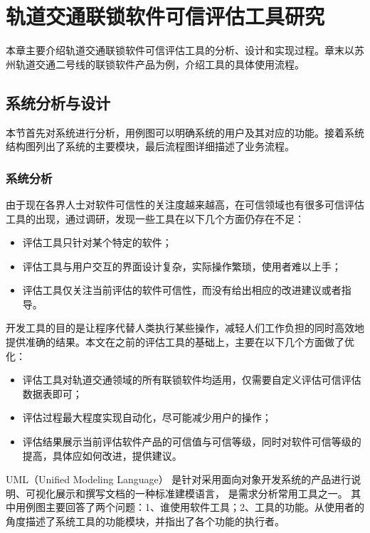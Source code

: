 
\chapter{轨道交通联锁软件可信评估工具研究}
\label{ch5}

\begin{kaishu}
	本章主要介绍轨道交通联锁软件可信评估工具的分析、设计和实现过程。章末以苏州轨道交通二号线的联锁软件产品为例，介绍工具的具体使用流程。
	
\end{kaishu}

\section{系统分析与设计}
本节首先对系统进行分析，用例图可以明确系统的用户及其对应的功能。接着系统结构图列出了系统的主要模块，最后流程图详细描述了业务流程。

\subsection{系统分析}
由于现在各界人士对软件可信性的关注度越来越高，在可信领域也有很多可信评估工具的出现，通过调研，发现一些工具在以下几个方面仍存在不足：
\begin{itemize}
    \item 评估工具只针对某个特定的软件；
    \item 评估工具与用户交互的界面设计复杂，实际操作繁琐，使用者难以上手；
    \item 评估工具仅关注当前评估的软件可信性，而没有给出相应的改进建议或者指导。
\end{itemize}

开发工具的目的是让程序代替人类执行某些操作，减轻人们工作负担的同时高效地提供准确的结果。本文在之前的评估工具的基础上，主要在以下几个方面做了优化：
\begin{itemize}
    \item 评估工具对轨道交通领域的所有联锁软件均适用，仅需要自定义评估可信评估数据表即可；
    \item 评估过程最大程度实现自动化，尽可能减少用户的操作；
    \item 评估结果展示当前评估软件产品的可信值与可信等级，同时对软件可信等级的提高，具体应如何改进，提供建议。
\end{itemize}

UML（Unified Modeling Language）
是针对采用面向对象开发系统的产品进行说明、可视化展示和撰写文档的一种标准建模语言，
是需求分析常用工具之一\cite{Li2017Research}。
其中用例图主要回答了两个问题：1、谁使用软件工具；2、工具的功能。从使用者的角度描述了系统工具的功能模块，并指出了各个功能的执行者。

